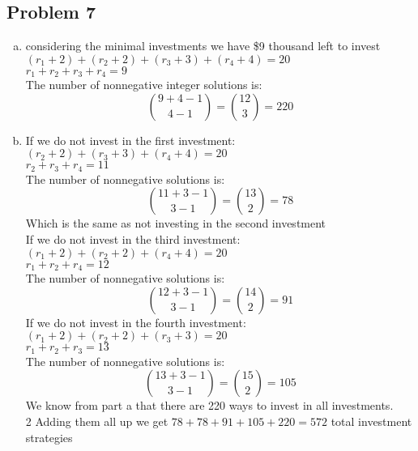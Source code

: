 \documentclass{article}
\begin{document}
\begin{flushleft}
\section*{Problem 7}
\begin{enumerate}[(a)]
\item considering the minimal investments we have \$9 thousand left to invest\\
$(r_1+2)+(r_2+2)+(r_3+3)+(r_4+4)=20$\\
$r_1+r_2+r_3+r_4=9$\\
The number of nonnegative integer solutions is:
\[{9+4-1\choose 4-1}={12\choose 3}=220
\]
\item If we do not invest in the first investment:\\
$(r_2+2)+(r_3+3)+(r_4+4)=20$\\
$r_2+r_3+r_4=11$\\
The number of nonnegative solutions is:
\[{11+3-1\choose 3-1}={13\choose 2}=78
\]
Which is the same as not investing in the second investment\\
If we do not invest in the third investment:\\
$(r_1+2)+(r_2+2)+(r_4+4)=20$\\
$r_1+r_2+r_4=12$\\
The number of nonnegative solutions is:
\[{12+3-1\choose 3-1}={14\choose 2}=91
\]
If we do not invest in the fourth investment:\\
$(r_1+2)+(r_2+2)+(r_3+3)=20$\\
$r_1+r_2+r_3=13$\\
The number of nonnegative solutions is:
\[{13+3-1\choose 3-1}={15\choose 2}=105
\]
We know from part a that there are 220 ways to invest in all investments.\\2
Adding them all up we get
$78+78+91+105+220=572$ total investment strategies
\end{enumerate}
\pagebreak

\end{flushleft}
\end{document}
